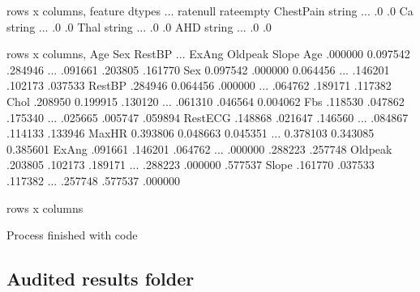 \documentclass[letterpaper,12pt,english]{sphinxmanual}
\begin{document}
\begin{sphinxVerbatim}[commandchars=\\\{\}]
\PYG{o}{[} rows x  columns\PYG{o}{]},      feature  dtypes     ...      rate\PYGZus{}null  rate\PYGZus{}empty
  ChestPain  string     ...            .0         .0
         Ca  string     ...            .0         .0
       Thal  string     ...            .0         .0
        AHD  string     ...            .0         .0

\PYG{o}{[} rows x  columns\PYG{o}{]},               Age       Sex    RestBP    ...        ExAng   Oldpeak     Slope
Age      .000000 \PYGZhy{}0.097542  .284946    ...     .091661  .203805  .161770
Sex     \PYGZhy{}0.097542  .000000 \PYGZhy{}0.064456    ...     .146201  .102173  .037533
RestBP   .284946 \PYGZhy{}0.064456  .000000    ...     .064762  .189171  .117382
Chol     .208950 \PYGZhy{}0.199915  .130120    ...     .061310  .046564 \PYGZhy{}0.004062
Fbs      .118530  .047862  .175340    ...     .025665  .005747  .059894
RestECG  .148868  .021647  .146560    ...     .084867  .114133  .133946
MaxHR   \PYGZhy{}0.393806 \PYGZhy{}0.048663 \PYGZhy{}0.045351    ...    \PYGZhy{}0.378103 \PYGZhy{}0.343085 \PYGZhy{}0.385601
ExAng    .091661  .146201  .064762    ...     .000000  .288223  .257748
Oldpeak  .203805  .102173  .189171    ...     .288223  .000000  .577537
Slope    .161770  .037533  .117382    ...     .257748  .577537  .000000

\PYG{o}{[} rows x  columns\PYG{o}{]}

Process finished with  code 
\end{sphinxVerbatim}


\subsection{Audited results folder}
\label{\detokenize{demo:audited-results-folder}}\begin{quote}

\begin{figure}[htbp]
\centering

\noindent{}
\end{figure}
\end{quote}
\end{document}
